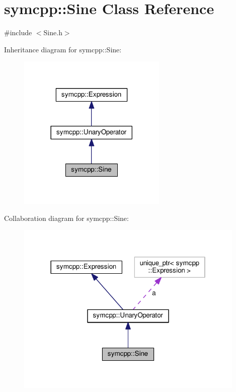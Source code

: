 \hypertarget{classsymcpp_1_1Sine}{}\section{symcpp\+:\+:Sine Class Reference}
\label{classsymcpp_1_1Sine}


{\ttfamily \#include $<$Sine.\+h$>$}



Inheritance diagram for symcpp\+:\+:Sine\+:\nopagebreak
\begin{figure}[H]
\begin{center}
\leavevmode
\includegraphics[width=201pt]{classsymcpp_1_1Sine__inherit__graph}
\end{center}
\end{figure}


Collaboration diagram for symcpp\+:\+:Sine\+:\nopagebreak
\begin{figure}[H]
\begin{center}
\leavevmode
\includegraphics[width=310pt]{classsymcpp_1_1Sine__coll__graph}
\end{center}
\end{figure}
